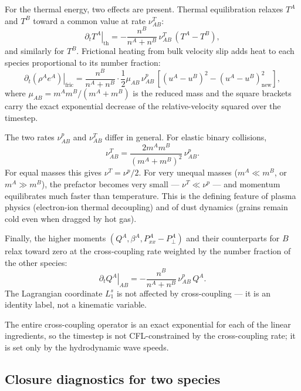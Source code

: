 \documentclass[11pt,letterpaper]{article}
\begin{document}
For the thermal energy, two effects are present. Thermal equilibration relaxes $T^A$ and $T^B$ toward a common value at rate $\nu^T_{AB}$:
\begin{equation}
\left.\partial_t T^A\right|_{\mathrm{th}} = -\frac{n^B}{n^A + n^B}\,\nu^T_{AB}\,(T^A - T^B),
\end{equation}
and similarly for $T^B$. Frictional heating from bulk velocity slip adds heat to each species proportional to its number fraction:
\begin{equation}
\left.\partial_t(\rho^A e^A)\right|_{\mathrm{fric}} = \frac{n^B}{n^A + n^B}\cdot\frac{1}{2}\mu_{AB}\,\nu^p_{AB}\,\left[(u^A - u^B)^2 - (u^A - u^B)^2_{\mathrm{new}}\right],
\end{equation}
where $\mu_{AB} = m^A m^B/(m^A + m^B)$ is the reduced mass and the square brackets carry the exact exponential decrease of the relative-velocity squared over the timestep.

The two rates $\nu^p_{AB}$ and $\nu^T_{AB}$ differ in general. For elastic binary collisions,
\begin{equation}
\nu^T_{AB} = \frac{2 m^A m^B}{(m^A + m^B)^2}\,\nu^p_{AB}.
\label{eq:nu_T_relation}
\end{equation}
For equal masses this gives $\nu^T = \nu^p/2$. For very unequal masses ($m^A \ll m^B$, or $m^A \gg m^B$), the prefactor becomes very small --- $\nu^T \ll \nu^p$ --- and momentum equilibrates much faster than temperature. This is the defining feature of plasma physics (electron-ion thermal decoupling) and of dust dynamics (grains remain cold even when dragged by hot gas).

Finally, the higher moments $(Q^A, \beta^A, P_{xx}^A - P_\perp^A)$ and their counterparts for $B$ relax toward zero at the cross-coupling rate weighted by the number fraction of the other species:
\begin{equation}
\left.\partial_t Q^A\right|_{AB} = -\frac{n^B}{n^A + n^B}\,\nu^p_{AB}\, Q^A.
\end{equation}
The Lagrangian coordinate $L_1^s$ is not affected by cross-coupling --- it is an identity label, not a kinematic variable.

The entire cross-coupling operator is an exact exponential for each of the linear ingredients, so the timestep is not CFL-constrained by the cross-coupling rate; it is set only by the hydrodynamic wave speeds.

\subsection{Closure diagnostics for two species}
\end{document}
